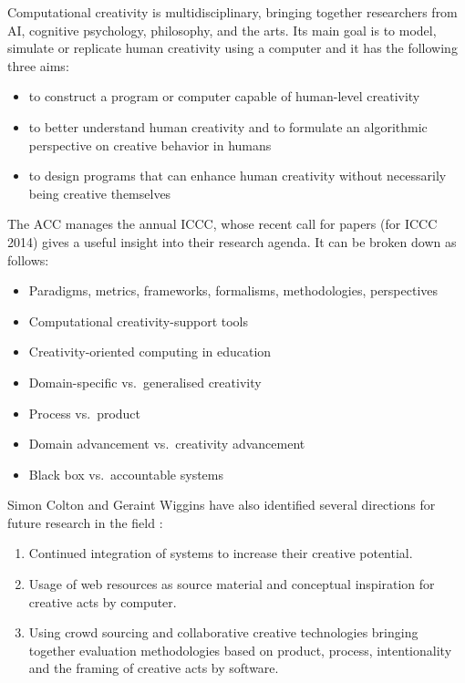Computational creativity is multidisciplinary, bringing together researchers from \ac{AI}, cognitive psychology, philosophy, and the arts.  Its main goal is to model, simulate or replicate human creativity using a computer and it has the following three aims:

\begin{itemize}
  \item to construct a program or computer capable of human-level creativity
  \item to better understand human creativity and to formulate an algorithmic perspective on creative behavior in humans
  \item to design programs that can enhance human creativity without necessarily being creative themselves
\end{itemize}

The \acf{ACC} manages the annual \ac{ICCC}, whose recent call for papers (for \ac{ICCC} 2014) gives a useful insight into their research agenda. It can be broken down as follows:

\begin{itemize}
  \item Paradigms, metrics, frameworks, formalisms, methodologies, perspectives
  \item Computational creativity-support tools
  \item Creativity-oriented computing in education
  \item Domain-specific vs.\ generalised creativity
  \item Process vs.\ product
  \item Domain advancement vs.\ creativity advancement
  \item Black box vs.\ accountable systems
\end{itemize}

Simon Colton and Geraint Wiggins have also identified several directions for future research in the field \autocite*{Colton2012}:

\begin{enumerate}
  \item Continued integration of systems to increase their creative potential.
  \item Usage of web resources as source material and conceptual inspiration for creative acts by computer.
  \item Using crowd sourcing and collaborative creative technologies bringing together evaluation methodologies based on product, process, intentionality and the framing of creative acts by software.
\end{enumerate}



